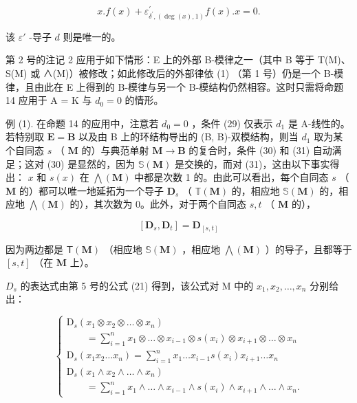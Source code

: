 \[
x. f (x) + \varepsilon_ {\delta ^ {\prime}, (\deg (x), 1)} ^ {\prime} f (x). x = 0.\tag{34}
\]

该 \(\varepsilon'\) -导子 \(d\) 则是唯一的。

第 2 号的注记 2 应用于如下情形：E 上的外部 B-模律之一（其中 B 等于 T(M)、S(M) 或 ∧(M)）被修改；如此修改后的外部律依 (1) （第 1 号）仍是一个 B-模律，且由此在 E 上得到的 B-模律与另一个 B-模结构仍然相容。这时只需将命题 14 应用于 A = K 与 \(d_{0} = 0\) 的情形。

例 (1). 在命题 14 的应用中，注意若 \(d_0 = 0\) ，条件 (29) 仅表示 \(d_1\) 是 A-线性的。若特别取 \(\mathbf{E} = \mathbf{B}\) 以及由 B 上的环结构导出的 (B, B)-双模结构，则当 \(d_1\) 取为某个自同态 \(s\) （ \(\mathbf{M}\) 的）与典范单射 \(\mathbf{M} \to \mathbf{B}\) 的复合时，条件 (30) 和 (31) 自动满足；这对 (30) 是显然的，因为 \(\mathbb{S}(\mathbf{M})\) 是交换的，而对 (31)，这由以下事实得出： \(x\) 和 \(s(x)\) 在 \(\bigwedge (\mathbf{M})\) 中都是次数 1 的。由此可以看出，每个自同态 \(s\) （ \(\mathbf{M}\) 的）都可以唯一地延拓为一个导子 \(\mathbf{D}_s\) （ \(\mathbb{T}(\mathbf{M})\) 的，相应地 \(\mathbb{S}(\mathbf{M})\) 的，相应地 \(\bigwedge (\mathbf{M})\) 的），其次数为 0。此外，对于两个自同态 \(s, t\) （ \(\mathbf{M}\) 的），

\[
[ \mathbf {D} _ {s}, \mathbf {D} _ {t} ] = \mathbf {D} _ {[ s, t ]}\tag{35}
\]

因为两边都是 \(\mathsf{T}(\mathbf{M})\) （相应地 \(\mathbb{S}(\mathbf{M})\) ，相应地 \(\bigwedge (\mathbf{M})\) ）的导子，且都等于 \([s, t]\) （在 \(\mathbf{M}\) 上）。

\(D_{s}\) 的表达式由第 5 号的公式 (21) 得到，该公式对 M 中的 \(x_{1}, x_{2}, \ldots, x_{n}\) 分别给出：

\[
\left\{ \begin{array}{l} \mathrm{D} _ {s} (x _ {1} \otimes x _ {2} \otimes \dots \otimes x _ {n}) \\ \qquad = \sum_ {i = 1} ^ {n} x _ {1} \otimes \dots \otimes x _ {i - 1} \otimes s (x _ {i}) \otimes x _ {i + 1} \otimes \dots \otimes x _ {n} \\ \mathrm{D} _ {s} (x _ {1} x _ {2} \dots x _ {n}) = \sum_ {i = 1} ^ {n} x _ {1} \dots x _ {i - 1} s (x _ {i}) x _ {i + 1} \dots x _ {n} \\ \mathrm{D} _ {s} (x _ {1} \wedge x _ {2} \wedge \dots \wedge x _ {n}) \\ \qquad = \sum_ {i = 1} ^ {n} x _ {1} \wedge \dots \wedge x _ {i - 1} \wedge s (x _ {i}) \wedge x _ {i + 1} \wedge \dots \wedge x _ {n}. \end{array} \right.\tag{36}
\]

